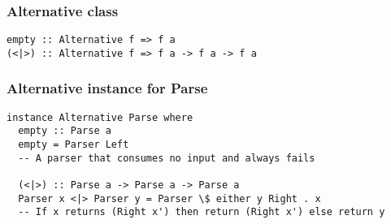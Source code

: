 \documentclass{beamer}
\begin{document}
\begin{frame}
\frametitle{Alternative class}
%
%

\begin{lstlisting}[frame=single]
empty :: Alternative f => f a
(<|>) :: Alternative f => f a -> f a -> f a
\end{lstlisting}


%
\end{frame}


\begin{frame}

\frametitle{Alternative instance for Parse}

\begin{lstlisting}[frame=single]
instance Alternative Parse where
  empty :: Parse a
  empty = Parser Left
  -- A parser that consumes no input and always fails

  (<|>) :: Parse a -> Parse a -> Parse a
  Parser x <|> Parser y = Parser \$ either y Right . x
  -- If x returns (Right x') then return (Right x') else return y
\end{lstlisting}

%

%
%

\end{frame}
\end{document}
